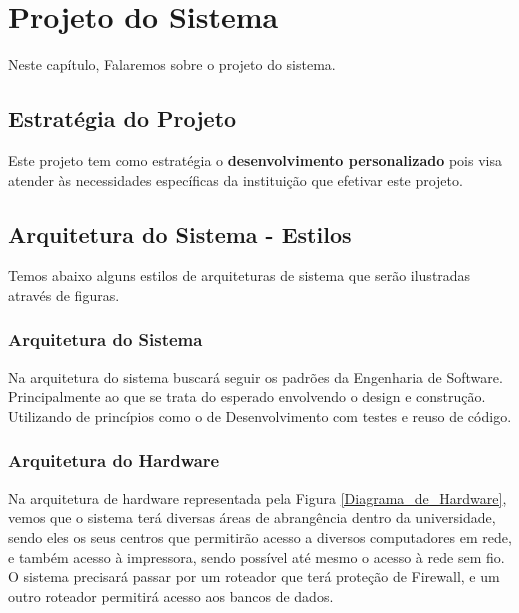 \chapter{Projeto do Sistema}
    Neste capítulo, Falaremos sobre o projeto do sistema.
    
    \section{Estratégia do Projeto}
        Este projeto tem como estratégia o \textbf{desenvolvimento personalizado} pois visa atender às necessidades específicas da instituição que efetivar este projeto.
        
    
    \section{Arquitetura do Sistema - Estilos}
        Temos abaixo alguns estilos de arquiteturas de sistema que serão ilustradas através de figuras.
        
        \subsection{Arquitetura do Sistema}
            Na arquitetura do sistema buscará seguir os padrões da Engenharia de Software. Principalmente ao que se trata do esperado envolvendo o design e construção. Utilizando de princípios como o de Desenvolvimento com testes e reuso de código.
        
        \subsection{Arquitetura do Hardware}
            Na arquitetura de hardware representada pela Figura \ref{Diagrama_de_Hardware}, vemos que o sistema terá diversas áreas de abrangência dentro da universidade, sendo eles os seus centros que permitirão acesso a diversos computadores em rede, e também acesso à impressora, sendo possível até mesmo o acesso à rede sem fio. O sistema precisará passar por um roteador que terá proteção de Firewall, e um outro roteador permitirá acesso aos bancos de dados.
            
